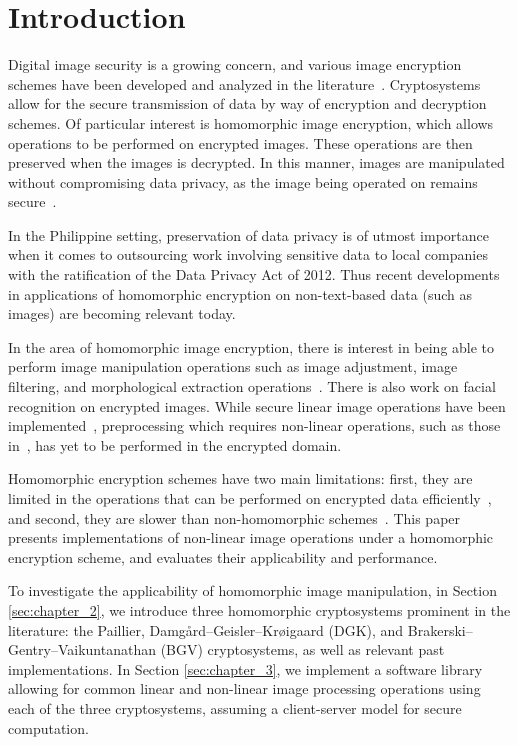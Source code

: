 \section{Introduction}
Digital image security is a growing concern, and various image encryption schemes have been developed and analyzed in the literature~\cite{murugan_survey_2018, kester_cryptographic_2015, jain_image_2016, singh_image_2015, khoirom_cryptanalysis_2018}. Cryptosystems allow for the secure transmission of data by way of encryption and decryption schemes. 
Of particular interest is homomorphic image encryption, which allows operations to be performed on encrypted images. These operations are then preserved when the images is decrypted. In this manner, images are manipulated without compromising data privacy, as the image being operated on remains secure~\cite{fontaine_survey_2007, sen_homomorphic_2013}. 

In the Philippine setting, preservation of data privacy is of utmost importance when it comes to outsourcing work involving sensitive data to local companies with the ratification of the Data Privacy Act of 2012. Thus recent developments in applications of homomorphic encryption on non-text-based data (such as images) are becoming relevant today.

In the area of homomorphic image encryption, there is interest in being able to perform image manipulation operations such as image adjustment, image filtering, and morphological extraction operations~\cite{ziad_cryptoimg:_2016, gonzalez_digital_2008}. There is also work on facial recognition on encrypted images\cite{turk_eigenfaces_1991, hutchison_privacy-preserving_2009}. While secure linear image operations have been implemented~\cite{ziad_cryptoimg:_2016}, preprocessing which requires non-linear operations, such as those in~\cite{oravec_illumination_2010}, has yet to be performed in the encrypted domain.

Homomorphic encryption schemes have two main limitations: first, they are limited in the operations that can be performed on encrypted data efficiently~\cite{li_elliptic_2012}, and second, they are slower than non-homomorphic schemes~\cite{sen_homomorphic_2013}. This paper presents implementations of non-linear image operations under a homomorphic encryption scheme, and evaluates their applicability and performance.

To investigate the applicability of homomorphic image manipulation, in Section \ref{sec:chapter_2}, we introduce three homomorphic cryptosystems prominent in the literature: the Paillier, Damg{\aa}rd--Geisler--Kr{\o}igaard (DGK), and Brakerski--Gentry--Vaikuntanathan (BGV) cryptosystems, as well as relevant past implementations. In Section \ref{sec:chapter_3}, we implement a software library allowing for common linear and non-linear image processing operations using each of the three cryptosystems, assuming a client-server model for secure computation.


